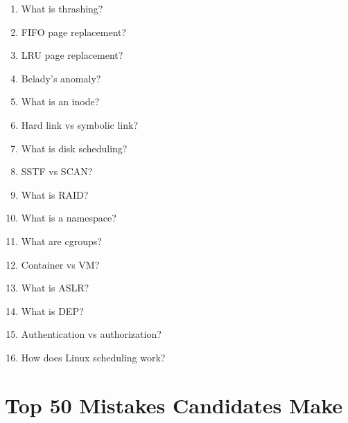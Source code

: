 \begin{enumerate}
\item What is thrashing?
\item FIFO page replacement?
\item LRU page replacement?
\item Belady's anomaly?
\item What is an inode?
\item Hard link vs symbolic link?
\item What is disk scheduling?
\item SSTF vs SCAN?
\item What is RAID?
\item What is a namespace?
\item What are cgroups?
\item Container vs VM?
\item What is ASLR?
\item What is DEP?
\item Authentication vs authorization?
\item How does Linux scheduling work?
\end{enumerate}

\section{Top 50 Mistakes Candidates Make}

